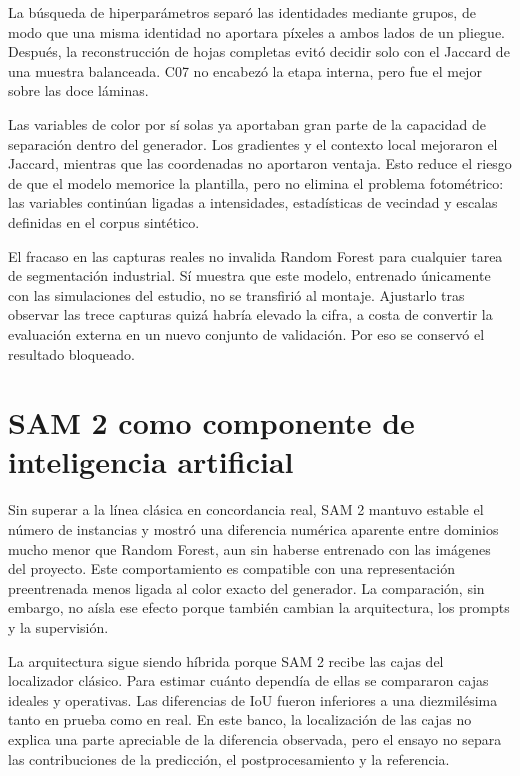 La búsqueda de hiperparámetros separó las identidades mediante grupos, de modo que una misma identidad no aportara píxeles a ambos lados de un pliegue. Después, la reconstrucción de hojas completas evitó decidir solo con el Jaccard de una muestra balanceada. C07 no encabezó la etapa interna, pero fue el mejor sobre las doce láminas.

Las variables de color por sí solas ya aportaban gran parte de la capacidad de separación dentro del generador. Los gradientes y el contexto local mejoraron el Jaccard, mientras que las coordenadas no aportaron ventaja. Esto reduce el riesgo de que el modelo memorice la plantilla, pero no elimina el problema fotométrico: las variables continúan ligadas a intensidades, estadísticas de vecindad y escalas definidas en el corpus sintético.

El fracaso en las capturas reales no invalida Random Forest para cualquier tarea de segmentación industrial. Sí muestra que este modelo, entrenado únicamente con las simulaciones del estudio, no se transfirió al montaje. Ajustarlo tras observar las trece capturas quizá habría elevado la cifra, a costa de convertir la evaluación externa en un nuevo conjunto de validación. Por eso se conservó el resultado bloqueado.

\section{SAM 2 como componente de inteligencia artificial}

Sin superar a la línea clásica en concordancia real, SAM 2 mantuvo estable el número de instancias y mostró una diferencia numérica aparente entre dominios mucho menor que Random Forest, aun sin haberse entrenado con las imágenes del proyecto. Este comportamiento es compatible con una representación preentrenada menos ligada al color exacto del generador. La comparación, sin embargo, no aísla ese efecto porque también cambian la arquitectura, los prompts y la supervisión.

La arquitectura sigue siendo híbrida porque SAM 2 recibe las cajas del localizador clásico. Para estimar cuánto dependía de ellas se compararon cajas ideales y operativas. Las diferencias de IoU fueron inferiores a una diezmilésima tanto en prueba como en real. En este banco, la localización de las cajas no explica una parte apreciable de la diferencia observada, pero el ensayo no separa las contribuciones de la predicción, el postprocesamiento y la referencia.

